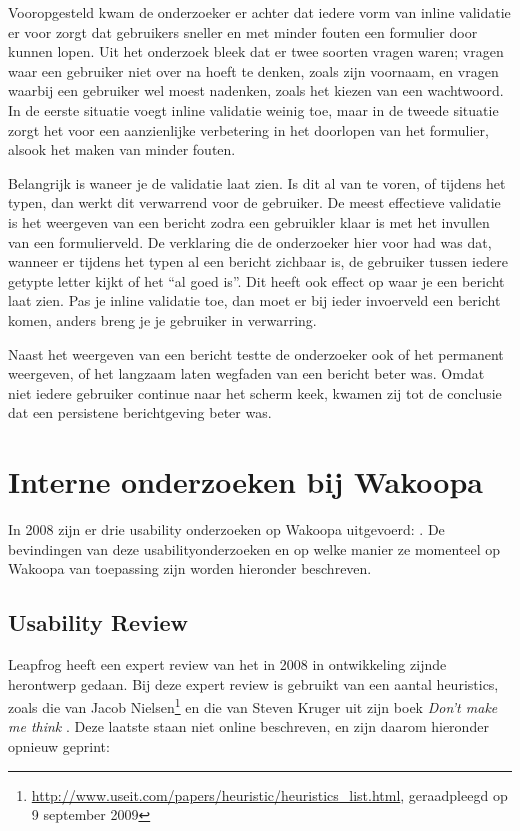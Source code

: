 \documentclass[a4paper, 10pt, pdftex]{report}
\begin{document}
    Vooropgesteld kwam de onderzoeker er achter  dat iedere vorm van inline validatie er voor zorgt dat gebruikers sneller en met minder fouten een formulier door kunnen lopen. Uit het onderzoek bleek dat er twee soorten vragen waren; vragen waar een gebruiker niet over na hoeft te denken, zoals zijn voornaam, en vragen waarbij een gebruiker wel moest nadenken, zoals het kiezen van een wachtwoord. In de eerste situatie voegt inline validatie weinig toe, maar in de tweede situatie zorgt het voor een aanzienlijke verbetering in het doorlopen van het formulier, alsook het maken van minder fouten.

    Belangrijk is waneer je de validatie laat zien. Is dit al van te voren, of tijdens het typen, dan werkt dit verwarrend voor de gebruiker. De meest effectieve validatie is het weergeven van een bericht zodra een gebruikler klaar is met het invullen van een formulierveld. De verklaring die de onderzoeker hier voor had was dat, wanneer er tijdens het typen al een bericht zichbaar is, de gebruiker tussen iedere getypte letter kijkt of het ``al goed is''. Dit heeft ook effect op waar je een bericht laat zien. Pas je inline validatie toe, dan moet er bij ieder invoerveld een bericht komen, anders breng je je gebruiker in verwarring.

    Naast het weergeven van een bericht testte de onderzoeker ook of het permanent weergeven, of het langzaam laten wegfaden van een bericht beter was. Omdat niet iedere gebruiker continue naar het scherm keek, kwamen zij tot de conclusie dat een persistene berichtgeving beter was.

  \section{Interne onderzoeken bij Wakoopa}
    In 2008 zijn er drie usability onderzoeken op Wakoopa uitgevoerd: \citet{Timmerman2008, Hoekman2008, Alfrink2008}. De bevindingen van deze usabilityonderzoeken en op welke manier ze momenteel op Wakoopa van toepassing zijn worden hieronder beschreven.

    \subsection{Usability Review \citet{Alfrink2008}}
    Leapfrog heeft een expert review van het in 2008 in ontwikkeling zijnde herontwerp gedaan. Bij deze expert review is gebruikt van een aantal heuristics, zoals die van Jacob Nielsen\footnote{\url{http://www.useit.com/papers/heuristic/heuristics\_list.html}, geraadpleegd op 9 september 2009} en die van Steven Kruger uit zijn boek \emph{Don't make me think} \citep{Krug2000}. Deze laatste staan niet online beschreven, en zijn daarom hieronder opnieuw geprint:
\end{document}
